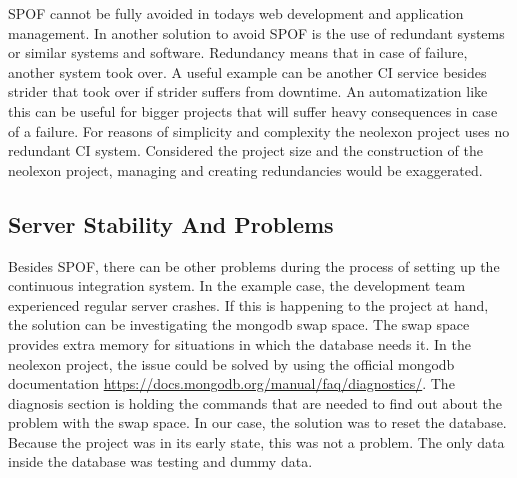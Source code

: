 SPOF cannot be fully avoided in todays web development and application management. In \cite{ulbrich2012eliminating} another solution to avoid SPOF is
the use of redundant systems or similar systems and software. Redundancy means that in case of failure, another system took over. A useful example
can be another CI service besides strider that took over if strider suffers from downtime. An automatization like this can be useful for bigger
projects that will suffer heavy consequences in case of a failure. For reasons of simplicity and complexity the neolexon project uses no redundant
CI system. Considered the project size and the construction of the neolexon project, managing and creating redundancies would be exaggerated.

\subsection{Server Stability And Problems}
\label{section:Server Stability And Problems}
Besides SPOF, there can be other problems during the process of setting up the continuous integration system. In the example case, the development team
experienced regular server crashes. If this is happening to the project at hand, the solution can be investigating the mongodb swap space.
The swap space provides extra memory for situations in which the database needs it. In the neolexon project, the issue could be solved by using the official
mongodb documentation \url{https://docs.mongodb.org/manual/faq/diagnostics/}. The diagnosis section is holding the commands that are needed to find out about the problem with the swap space. In our case,
the solution was to reset the database. Because the project was in its early state, this was not a problem. The only data inside the database was testing and
dummy data.

\newpage
